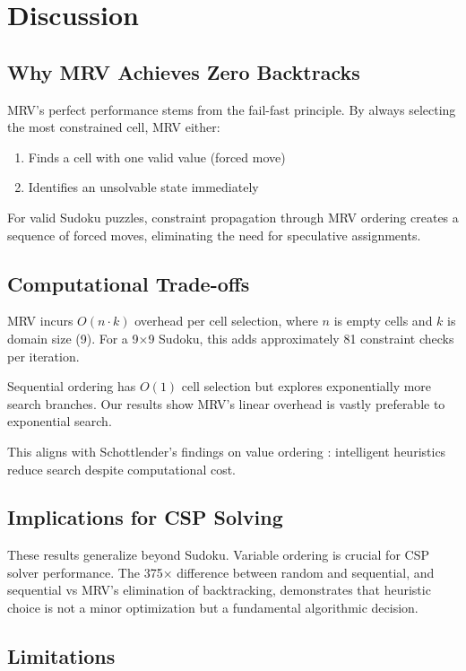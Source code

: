 \documentclass[conference]{IEEEtran}
\begin{document}
\section{Discussion}

\subsection{Why MRV Achieves Zero Backtracks}

MRV's perfect performance stems from the fail-fast principle. By always selecting the most constrained cell, MRV either:
\begin{enumerate}
    \item Finds a cell with one valid value (forced move)
    \item Identifies an unsolvable state immediately
\end{enumerate}

For valid Sudoku puzzles, constraint propagation through MRV ordering creates a sequence of forced moves, eliminating the need for speculative assignments.

\subsection{Computational Trade-offs}

MRV incurs $O(n \cdot k)$ overhead per cell selection, where $n$ is empty cells and $k$ is domain size (9). For a 9×9 Sudoku, this adds approximately 81 constraint checks per iteration.

Sequential ordering has $O(1)$ cell selection but explores exponentially more search branches. Our results show MRV's linear overhead is vastly preferable to exponential search.

This aligns with Schottlender's findings on value ordering \cite{schottlender2014}: intelligent heuristics reduce search despite computational cost.

\subsection{Implications for CSP Solving}

These results generalize beyond Sudoku. Variable ordering is crucial for CSP solver performance. The 375× difference between random and sequential, and sequential vs MRV's elimination of backtracking, demonstrates that heuristic choice is not a minor optimization but a fundamental algorithmic decision.

\subsection{Limitations}
\end{document}
